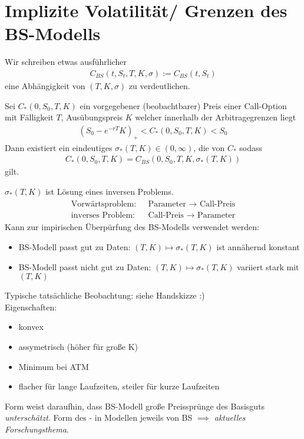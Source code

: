 \section{Implizite Volatilität/ Grenzen des BS-Modells}
Wir schreiben etwas ausführlicher
\begin{align*}
	C_{BS}(t,S_t, T, K, \sigma) := C_{BS}(t, S_t)
\end{align*}
eine Abhängigkeit von $(T,K,\sigma)$ zu verdeutlichen.
\begin{theorem} %
	Sei $C_{\ast}(0,S_0,T, K)$ ein vorgegebener (beobachtbarer) Preis einer Call-Option mit Fälligkeit $T$, Ausübungspreis $K$ welcher innerhalb der Arbitragegrenzen liegt
	\begin{align*}
		(S_0 - e^{-rT}K)_+ < C_{\ast}(0,S_0, T,K) < S_0
	\end{align*}
	Dann existiert ein eindeutiges $\sigma_{\ast}(T, K) \in (0,\infty)$, die  von $C_{\ast}$ sodass
	\begin{align*}
		C_{\ast}(0,S_0, T,K) = C_{BS}(0,S_0,T,K, \sigma_{\ast}(T,K))
	\end{align*}
	gilt.
\end{theorem}
\begin{*remark}
	$\sigma_{\ast}(T,K)$ ist Lösung eines inversen Problems.
	\begin{align*}
		\begin{matrix}
			\text{Vorwärtsproblem: } & \text{ Parameter }\to \text{ Call-Preis}\\
			\text{inverses Problem: } & \text{ Call-Preis }\to \text{ Parameter}
		\end{matrix}
	\end{align*}
	Kann zur impirischen Überpürfung des BS-Modells verwendet werden:
	\begin{itemize}
		\item BS-Modell passt gut zu Daten: $(T,K) \mapsto \sigma_{\ast}(T,K)$ ist annähernd konstant
		\item BS-Modell passt nicht gut zu Daten: $(T,K) \mapsto \sigma_{\ast}(T,K)$ variiert stark mit $(T,K)$
	\end{itemize}
\end{*remark}
Typische tatsächliche Beobachtung: siehe Handskizze :)\\
Eigenschaften:
\begin{itemize}
	\item konvex
	\item assymetrisch (höher für große K)
	\item Minimum bei ATM
	\item flacher für lange Laufzeiten, steiler für kurze Laufzeiten
\end{itemize}
Form weist daraufhin, dass BS-Modell große Preissprünge des Basisguts \emph{unterschätzt}. Form des - in Modellen jeweils von BS $\implies$ \emph{aktuelles Forschungsthema}.